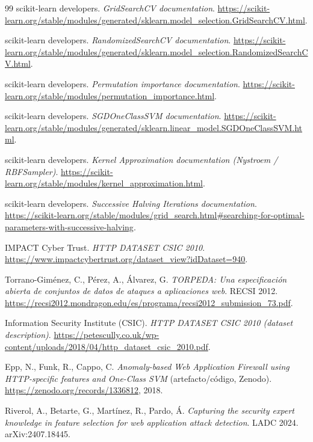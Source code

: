 \documentclass[12pt,oneside]{report}
\begin{document}
\begin{thebibliography}{99}
scikit-learn developers. \emph{GridSearchCV documentation}. \url{https://scikit-learn.org/stable/modules/generated/sklearn.model_selection.GridSearchCV.html}.

scikit-learn developers. \emph{RandomizedSearchCV documentation}. \url{https://scikit-learn.org/stable/modules/generated/sklearn.model_selection.RandomizedSearchCV.html}.

scikit-learn developers. \emph{Permutation importance documentation}. \url{https://scikit-learn.org/stable/modules/permutation_importance.html}.

scikit-learn developers. \emph{SGDOneClassSVM documentation}. \url{https://scikit-learn.org/stable/modules/generated/sklearn.linear_model.SGDOneClassSVM.html}.

scikit-learn developers. \emph{Kernel Approximation documentation (Nystroem / RBFSampler)}. \url{https://scikit-learn.org/stable/modules/kernel_approximation.html}.

scikit-learn developers. \emph{Successive Halving Iterations documentation}. \url{https://scikit-learn.org/stable/modules/grid_search.html#searching-for-optimal-parameters-with-successive-halving}.

IMPACT Cyber Trust. \emph{HTTP DATASET CSIC 2010}. \url{https://www.impactcybertrust.org/dataset_view?idDataset=940}.

Torrano-Gim{\'e}nez, C., P{\'e}rez, A., {\'A}lvarez, G.
\emph{TORPEDA: Una especificación abierta de conjuntos de datos de ataques a aplicaciones web}. RECSI 2012.
\url{https://recsi2012.mondragon.edu/es/programa/recsi2012_submission_73.pdf}.

Information Security Institute (CSIC).
\emph{HTTP DATASET CSIC 2010 (dataset description)}.
\url{https://petescully.co.uk/wp-content/uploads/2018/04/http_dataset_csic_2010.pdf}.

Epp, N., Funk, R., Cappo, C.
\emph{Anomaly-based Web Application Firewall using HTTP-specific features and One-Class SVM} (artefacto/código, Zenodo).
\url{https://zenodo.org/records/1336812}, 2018.

Riverol, A., Betarte, G., Martínez, R., Pardo, Á.
\emph{Capturing the security expert knowledge in feature selection for web application attack detection}.
LADC 2024. arXiv:2407.18445.


\end{thebibliography}
\end{document}
